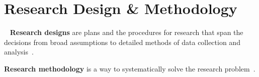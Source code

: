 \section{Research Design \& Methodology}~\label{sec:design}
\textbf{Research designs} are plans and the procedures for research that span the decisions from broad assumptions to detailed methods of data collection and analysis~\cite{Creswell:2014a}.

\textbf{Research methodology} is a way to systematically solve the research problem~\cite{Kothari:2004a}. 


